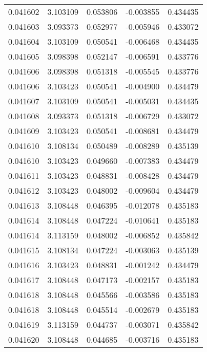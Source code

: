 \begin{tabular}{lrrrr}
0.041602    &  3.103109 &  0.053806 & -0.003855 &             0.434435 \\
0.041603    &  3.093373 &  0.052977 & -0.005946 &             0.433072 \\
0.041604    &  3.103109 &  0.050541 & -0.006468 &             0.434435 \\
0.041605    &  3.098398 &  0.052147 & -0.006591 &             0.433776 \\
0.041606    &  3.098398 &  0.051318 & -0.005545 &             0.433776 \\
0.041606    &  3.103423 &  0.050541 & -0.004900 &             0.434479 \\
0.041607    &  3.103109 &  0.050541 & -0.005031 &             0.434435 \\
0.041608    &  3.093373 &  0.051318 & -0.006729 &             0.433072 \\
0.041609    &  3.103423 &  0.050541 & -0.008681 &             0.434479 \\
0.041610    &  3.108134 &  0.050489 & -0.008289 &             0.435139 \\
0.041610    &  3.103423 &  0.049660 & -0.007383 &             0.434479 \\
0.041611    &  3.103423 &  0.048831 & -0.008428 &             0.434479 \\
0.041612    &  3.103423 &  0.048002 & -0.009604 &             0.434479 \\
0.041613    &  3.108448 &  0.046395 & -0.012078 &             0.435183 \\
0.041614    &  3.108448 &  0.047224 & -0.010641 &             0.435183 \\
0.041614    &  3.113159 &  0.048002 & -0.006852 &             0.435842 \\
0.041615    &  3.108134 &  0.047224 & -0.003063 &             0.435139 \\
0.041616    &  3.103423 &  0.048831 & -0.001242 &             0.434479 \\
0.041617    &  3.108448 &  0.047173 & -0.002157 &             0.435183 \\
0.041618    &  3.108448 &  0.045566 & -0.003586 &             0.435183 \\
0.041618    &  3.108448 &  0.045514 & -0.002679 &             0.435183 \\
0.041619    &  3.113159 &  0.044737 & -0.003071 &             0.435842 \\
0.041620    &  3.108448 &  0.044685 & -0.003716 &             0.435183 \\

\end{tabular}
